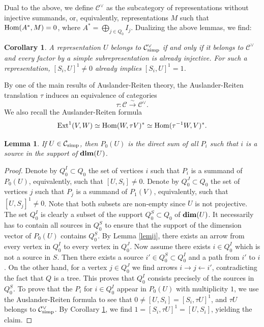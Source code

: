 \documentclass{amsart}
\numberwithin{equation}{section}
\newtheorem{lem}[thm]{Lemma}
\newtheorem{cor}[thm]{Corollary}
\theoremstyle{remark}
\begin{document}
Dual to the above, we define $\mathcal{C}^\vee$ as the subcategory of representations without injective summands, or, equivalently, representations $M$ such that ${\rm Hom}(A^*,M)=0$,
where $A^*=\bigoplus_{j\in Q_0} I_j$. Dualizing the above lemmas, we find:

\begin{cor}\label{cordual} A representation $U$ belongs to $\mathcal{C}^\vee_{\rm simp}$ 
if and only if it belongs to $\mathcal{C}^\vee$ and every factor by a simple subrepresentation 
is already injective. For such a representation, $[S_i,U]^1\not=0$ already implies $[S_i,U]^1=1$.
\end{cor}

By one of the main results of Auslander-Reiten theory, the Auslander-Reiten translation $\tau$ 
induces an equivalence of categories
$$\tau:\mathcal{C}\stackrel{\sim}{\rightarrow}\mathcal{C}^\vee.$$
We also recall the Auslander-Reiten formula
$${\rm Ext}^1(V,W)\simeq{\rm Hom}(W,\tau V)^*\simeq{\rm Hom}(\tau^{-1}W,V)^*.$$

\begin{lem}\label{lemp0u} If $U\in\mathcal{C}_{\rm simp}$, then $P_0(U)$ is the direct 
sum of all $P_i$ such that $i$ is a source in the support of ${\rm\bf dim}(U)$.
\end{lem}

\begin{proof} 
Denote by $Q_0^I\subset Q_0$ the set of vertices $i$ such that $P_i$ is a summand of $P_0(U)$, 
equivalently, such that $[U,S_i]\not=0$. Denote by $Q_0^J\subset Q_0$ the set of vertices $j$ 
such that $P_j$ is a summand of $P_1(V)$, equivalently, such that $[U,S_j]^1\not=0$. Note that 
both subsets are non-empty since $U$ is not projective. The set $Q_0^I$ is clearly a subset 
of the support $Q_0^S\subset Q_0$ of ${\rm\bf dim}(U)$.
It necessarily has to contain all sources in $Q_0^S$ to ensure that the support of the 
dimension vector of $P_0(U)$ contains $Q_0^S$. By Lemma \ref{lemij}, there exists an arrow 
from every vertex in $Q_0^I$ to every vertex in $Q_0^J$.
Now assume there exists $i\in Q_0^I$ which is not a source in $S$. Then there exists a source 
$i'\in Q_0^S\subset Q_0^I$ and a path from $i'$ to $i$. On the other hand, for a vertex $j\in Q_0^J$ 
we find arrows $i\rightarrow j\leftarrow i'$, contradicting the fact that $Q$ is a tree. 
This proves that $Q_0^I$ consists precisely of the sources in $Q_0^S$. To prove that the $P_i$ 
for $i\in Q_0^I$ appear in $P_0(U)$ with multiplicity $1$, we use the Auslander-Reiten formula 
to see that $0\not=[U,S_i]=[S_i,\tau U]^1$, and $\tau U$ belongs to $\mathcal{C}^\vee_{\rm simp}$. 
By Corollary \ref{cordual}, we find  $1=[S_i,\tau U]^1=[U,S_i]$, yielding the claim.
\end{proof}
\end{document}
